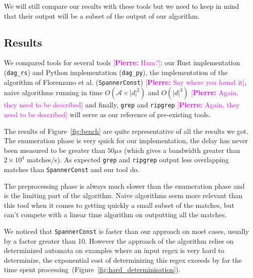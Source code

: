\documentclass[12px]{article}
\theoremstyle{definition}
\newcommand{\pierre}[1]{\textcolor{magenta}{[\textbf{Pierre:} #1]}}
\begin{document}
      We will still compare our results with these tools but we need to
      keep in mind that their output will be a subset of the output of our
      algorithm.

    \subsection{Results}

      We compared tools for several tools \pierre{Hum?}: our Rust implementation
      (\texttt{dag\_rs}) and Python implementation (\texttt{dag\_py}), the
      implementation of the algorithm of Florenzano et al.
      \cite{florenzano2018constant} (\texttt{SpannerConst}) \pierre{Say
      where you found it}, naive algorithms
      running in time $O(\mathcal{A} \times |d|^2)$ and $O(|d|^3)$
      \pierre{Again, they need to be described} and finally,
      \texttt{grep} and \texttt{ripgrep} \pierre{Again, they need to be
      described} will serve as our reference of
      pre-existing tools.

      The results of Figure~\ref{fig:bench} are quite representative of all the
      results we got. The enumeration phase is very quick for our
      implementation, the delay has never been measured to be greater than $50
      \mu s$ (which gives a bandwidth greater than $2 \times 10^4$ matches/s).
      As expected \texttt{grep} and \texttt{ripgrep} output less overlapping
      matches than \texttt{SpannerConst} and our tool do.

      The preprocessing phase is always much slower than the enumeration phase
      and is the limiting part of the algorithm. Naive algorithms seem more
      relevant than this tool when it comes to getting quickly a small subset
      of the matches, but can't compete with a linear time algorithm on
      outputting all the matches.

      We noticed that \texttt{SpannerConst} is faster than our approach on most
      cases, usually by a factor greater than 10. However the approach of the
      algorithm relies on determinized automata on examples where an input
      regex is very hard to determinize, the exponential cost of determinizing
      this regex exceeds by far the time spent
      processing~(Figure~\ref{fig:hard_determinisation}).
\end{document}
